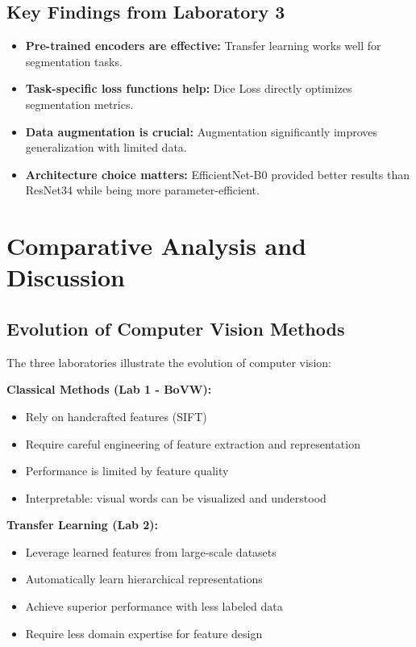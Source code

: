 \documentclass[conference]{IEEEtran}
\begin{document}
\subsection{Key Findings from Laboratory 3}

\begin{itemize}
\item \textbf{Pre-trained encoders are effective:} Transfer learning works well for segmentation tasks.
\item \textbf{Task-specific loss functions help:} Dice Loss directly optimizes segmentation metrics.
\item \textbf{Data augmentation is crucial:} Augmentation significantly improves generalization with limited data.
\item \textbf{Architecture choice matters:} EfficientNet-B0 provided better results than ResNet34 while being more parameter-efficient.
\end{itemize}

\section{Comparative Analysis and Discussion}

\subsection{Evolution of Computer Vision Methods}

The three laboratories illustrate the evolution of computer vision:

\textbf{Classical Methods (Lab 1 - BoVW):}
\begin{itemize}
\item Rely on handcrafted features (SIFT)
\item Require careful engineering of feature extraction and representation
\item Performance is limited by feature quality
\item Interpretable: visual words can be visualized and understood
\end{itemize}

\textbf{Transfer Learning (Lab 2):}
\begin{itemize}
\item Leverage learned features from large-scale datasets
\item Automatically learn hierarchical representations
\item Achieve superior performance with less labeled data
\item Require less domain expertise for feature design
\end{itemize}
\end{document}
